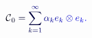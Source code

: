 \documentclass[12pt]{article}
\begin{document}
\makeatletter
\renewcommand*{\@textcolor}[3]{%
  \protect\leavevmode
  \begingroup
    \color#1{#2}#3%
  \endgroup
}
\makeatother
\begin{displaymath}
\mathcal { \mathcolor[RGB]{0,0,15}{C} } _ { \mathcolor[RGB]{0,0,30}{0} } \mathcolor[RGB]{0,0,45}{=} \mathcolor[RGB]{0,0,60}{\sum} _ { \mathcolor[RGB]{0,0,75}{k} \mathcolor[RGB]{0,0,90}{=} \mathcolor[RGB]{0,0,105}{1} } ^ { \mathcolor[RGB]{0,0,120}{\infty} } \mathcolor[RGB]{0,0,135}{\alpha} _ { \mathcolor[RGB]{0,0,150}{k} } \mathcolor[RGB]{0,0,165}{e} _ { \mathcolor[RGB]{0,0,180}{k} } \mathcolor[RGB]{0,0,195}{\otimes} \mathcolor[RGB]{0,0,210}{e} _ { \mathcolor[RGB]{0,0,225}{k} } \mathcolor[RGB]{0,0,240}{.}
\end{displaymath}
\end{document}

